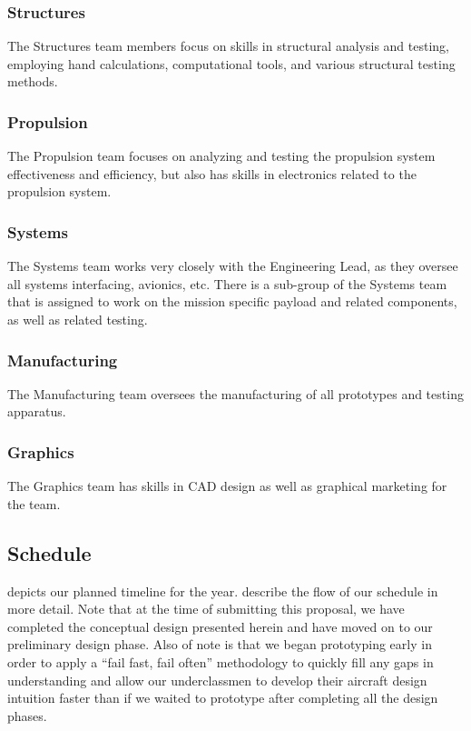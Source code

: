 \documentclass[proposal]{byu-aero}
\begin{document}
\subsubsection{Structures} The Structures team members focus on skills in structural analysis and testing, employing hand calculations, computational tools, and various structural testing methods.
\subsubsection{Propulsion} The Propulsion team focuses on analyzing and testing the propulsion system effectiveness and efficiency, but also has skills in electronics related to the propulsion system.
\subsubsection{Systems} The Systems team works very closely with the Engineering Lead, as they oversee all systems interfacing, avionics, etc.  There is a sub-group of the Systems team that is assigned to work on the mission specific payload and related components, as well as related testing. %
\subsubsection{Manufacturing} The Manufacturing team oversees the manufacturing of all prototypes and testing apparatus.
\subsubsection{Graphics} The Graphics team has skills in CAD design as well as graphical marketing for the team. 




\subsection{Schedule}
\label{ssec:Schedule}

 depicts our planned timeline for the year.  describe the flow of our schedule in more detail. Note that at the time of submitting this proposal, we have completed the conceptual design presented herein and have moved on to our preliminary design phase. Also of note is that we began prototyping early in order to apply a ``fail fast, fail often'' methodology to quickly fill any gaps in understanding and allow our underclassmen to develop their aircraft design intuition faster than if we waited to prototype after completing all the design phases.
\end{document}
